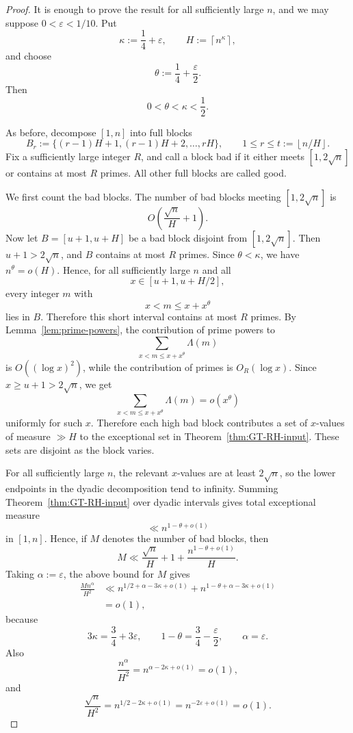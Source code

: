 \documentclass[11pt,reqno]{amsart}
\numberwithin{equation}{section}
\theoremstyle{plain}
\theoremstyle{definition}
\newcommand{\eps}{\varepsilon}
\newcommand{\floor}[1]{\left\lfloor #1\right\rfloor}
\newcommand{\ceil}[1]{\left\lceil #1\right\rceil}
\begin{document}
\begin{proof}
It is enough to prove the result for all sufficiently large $n$, and we may
suppose $0<\eps<1/10$.  Put
\[
        \kappa:=\frac14+\eps,
        \qquad H:=\ceil{n^\kappa},
\]
and choose
\[
        \theta:=\frac14+\frac{\eps}{2}.
\]
Then
\[
        0<\theta<\kappa<\frac12.
\]

As before, decompose $[1,n]$ into full blocks
\[
        B_r:=\{(r-1)H+1,(r-1)H+2,\ldots,rH\},
        \qquad 1\le r\le t:=\floor{n/H}.
\]
Fix a sufficiently large integer $R$, and call a block bad if it either meets
$[1,2\sqrt n]$ or contains at most $R$ primes.  All other full blocks are called
good.

We first count the bad blocks.  The number of bad blocks meeting
$[1,2\sqrt n]$ is
\[
        O\left(\frac{\sqrt n}{H}+1\right).
\]
Now let \(B=[u+1,u+H]\) be a bad block disjoint from \([1,2\sqrt n]\).
Then \(u+1>2\sqrt n\), and \(B\) contains at most \(R\) primes.  Since
\(\theta<\kappa\), we have \(n^\theta=o(H)\).  Hence, for all sufficiently
large \(n\) and all
\[
        x\in [u+1,u+H/2],
\]
every integer \(m\) with
\[
        x<m\le x+x^\theta
\]
lies in \(B\).  Therefore this short interval contains at most \(R\) primes.
By Lemma~\ref{lem:prime-powers}, the contribution of prime powers to
\[
        \sum_{x<m\le x+x^\theta}\Lambda(m)
\]
is \(O((\log x)^2)\), while the contribution of primes is \(O_R(\log x)\).
Since \(x\ge u+1>2\sqrt n\), we get
\[
        \sum_{x<m\le x+x^\theta}\Lambda(m)=o(x^\theta)
\]
uniformly for such \(x\).  Therefore each high bad block contributes a set of
\(x\)-values of measure \(\gg H\) to the exceptional set in
Theorem~\ref{thm:GT-RH-input}.  These sets are disjoint as the block varies.

For all sufficiently large \(n\), the relevant \(x\)-values are at least
\(2\sqrt n\), so the lower endpoints in the dyadic decomposition tend to
infinity.  Summing Theorem~\ref{thm:GT-RH-input} over dyadic intervals gives
total exceptional measure
\[
        \ll n^{1-\theta+o(1)}
\]
in \([1,n]\).  Hence, if \(M\) denotes the number of bad blocks, then
\[
        M\ll \frac{\sqrt n}{H}+1+\frac{n^{1-\theta+o(1)}}{H}.
\]
Taking \(\alpha:=\eps\), the above bound for \(M\) gives
\[
\begin{aligned}
        \frac{M n^\alpha}{H^2}
        &\ll
        n^{1/2+\alpha-3\kappa+o(1)}
        +
        n^{1-\theta+\alpha-3\kappa+o(1)}      \\
        &=o(1),
\end{aligned}
\]
because
\[
        3\kappa=\frac34+3\eps,
        \qquad
        1-\theta=\frac34-\frac{\eps}{2},
        \qquad
        \alpha=\eps.
\]
Also
\[
        \frac{n^\alpha}{H^2}
        =
        n^{\alpha-2\kappa+o(1)}
        =
        o(1),
\]
and
\[
        \frac{\sqrt n}{H^2}
        =
        n^{1/2-2\kappa+o(1)}
        =
        n^{-2\eps+o(1)}
        =
        o(1).
\]


\end{proof}
\end{document}
